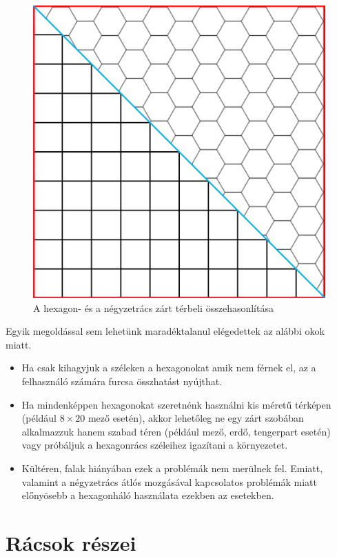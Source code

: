 \begin{figure}[h!]
\centering
\includegraphics[scale=0.1]{kepek/SqVsHex.png}
\caption{A hexagon- és a négyzetrács zárt térbeli összehasonlítása}
\label{fig:SqVsHex}
\end{figure}

\noindent Egyik megoldással sem lehetünk maradéktalanul elégedettek az alábbi okok miatt.
\begin{itemize}
\item Ha csak kihagyjuk a széleken a hexagonokat amik nem férnek el, az a felhasználó számára furcsa összhatást nyújthat.
\item Ha mindenképpen hexagonokat szeretnénk használni kis méretű térképen (például $8 \times 20$ mező esetén), akkor lehetőleg ne egy zárt szobában alkalmazzuk hanem szabad téren (például mező, erdő, tengerpart esetén) vagy próbáljuk a hexagonrács széleihez igazítani a környezetet.
\item Kültéren, falak hiányában ezek a problémák nem merülnek fel. Emiatt, valamint a négyzetrács átlós mozgásával kapcsolatos problémák miatt előnyösebb a hexagonháló használata ezekben az esetekben.
\end{itemize}

\section{Rácsok részei}

